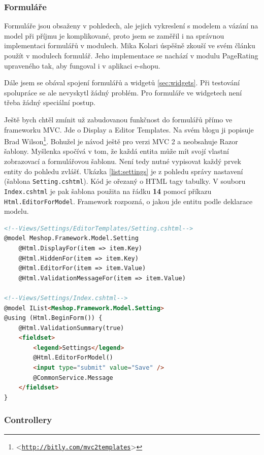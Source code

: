 \documentclass[11pt,twoside,a4paper]{book}
\let\oldUrl\url
\renewcommand\url[1]{<\texttt{\oldUrl{#1}}>}
\begin{document}
\subsubsection{Formuláře}

Formuláře jsou obsaženy v pohledech, ale jejich vykreslení s modelem a vázání na model při příjmu je komplikované, proto jsem se zaměřil i na správnou implementaci formulářů v modulech. Mika Kolari\cite{kolari} úspěšně zkouší ve svém článku použít v modulech formulář. Jeho implementace se nachází v modulu \textsf{PageRating} upraveného tak, aby fungoval i v aplikaci e-shopu.

Dále jsem se obával spojení formulářů a widgetů \ref{sec:widgets}. Při testování spolupráce se ale nevyskytl žádný problém. Pro formuláře ve widgetech není třeba žádný speciální postup.

Ještě bych chtěl zmínit už zabudovanou funkčnost do formulářů přímo ve frameworku MVC. Jde o \textsf{Display} a \textsf{Editor Templates}. Na svém blogu ji popisuje Brad Wilson\footnote{\url{http://bitly.com/mvc2templates}}. Bohužel je návod ještě pro verzi MVC 2 a neobsahuje Razor šablony. Myšlenka spočívá v tom, že každá entita může mít svojí vlastní zobrazovací a formulářovou šablonu. Není tedy nutné vypisovat každý prvek entity do pohledu zvlášť. Ukázka \ref{list:settings} je z pohledu správy nastavení (šablona \texttt{Setting.cshtml}). Kód je ořezaný o HTML tagy tabulky. V souboru \texttt{Index.cshtml} je pak šablona použita na řádku \textbf{14} pomocí příkazu \texttt{Html.EditorForModel}. Framework rozpozná, o jakou jde entitu podle deklarace modelu.

\begin{lstlisting}[float=h!,language=HTML, caption={šablony pro formuláře}, label=list:settings]
<!--Views/Settings/EditorTemplates/Setting.cshtml-->
@model Meshop.Framework.Model.Setting
	@Html.DisplayFor(item => item.Key)
	@Html.HiddenFor(item => item.Key)
	@Html.EditorFor(item => item.Value)
	@Html.ValidationMessageFor(item => item.Value)

<!--Views/Settings/Index.cshtml-->
@model IList<Meshop.Framework.Model.Setting>
@using (Html.BeginForm()) {
    @Html.ValidationSummary(true)
    <fieldset>
        <legend>Settings</legend>
        @Html.EditorForModel()
        <input type="submit" value="Save" /> 
        @CommonService.Message
    </fieldset>
}
\end{lstlisting}

\subsubsection{Controllery}
\end{document}
